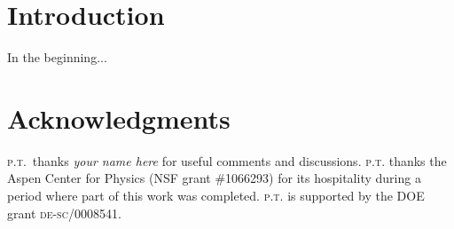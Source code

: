 \documentclass[12pt]{article}
\begin{document}
\small
\setcounter{tocdepth}{2}
\tableofcontents
\normalsize



\section{Introduction}

In the beginning... \lipsum[5]

 


 \section*{Acknowledgments}


\textsc{p.t.}\ thanks 
\emph{your name here}
for useful comments and discussions. 
%
\textsc{p.t.} thanks the Aspen Center for Physics (NSF grant \#1066293) for its hospitality during a period where part of this work was completed. \textsc{p.t.} is supported by the DOE grant \textsc{de-sc}/0008541.



% 
\end{document}
